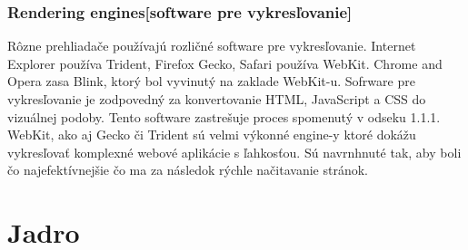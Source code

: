 \documentclass[10pt,Slovak,a4paper]{article}
\begin{document}
\begin{paragraph}
        \subsubsection{Rendering engines[software pre vykresľovanie]}
            Rôzne prehliadače používajú rozličné software pre vykresľovanie. Internet Explorer používa Trident, Firefox Gecko, Safari používa WebKit. Chrome and Opera zasa Blink, ktorý bol vyvinutý na zaklade WebKit-u. 
            Sofrware pre vykresľovanie je zodpovedný za konvertovanie HTML, JavaScript a CSS do vizuálnej podoby. Tento software zastrešuje proces spomenutý v odseku 1.1.1.
            WebKit, ako aj Gecko či Trident sú velmi výkonné engine-y ktoré dokážu vykresľovať komplexné webové aplikácie s ľahkosťou. Sú navrnhnuté tak, aby boli čo najefektívnejšie čo ma za následok rýchle načitavanie stránok.\\
            \cite{ako_prehliadace_funguju}
            \pagebreak
    \end{paragraph}    
\section{Jadro}
\end{document}
